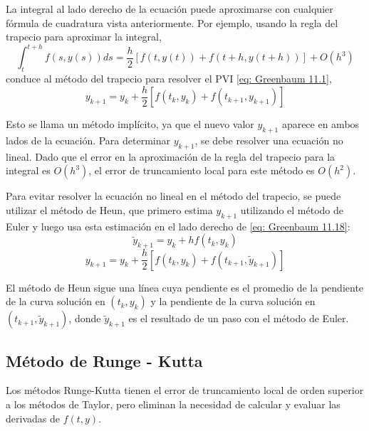La integral al lado derecho de la ecuación puede aproximarse con cualquier fórmula de cuadratura vista anteriormente. Por ejemplo, usando la regla del trapecio para aproximar la integral,
\[ \int_{t}^{t + h} f(s, y(s)) ds = \frac{h}{2}[f(t, y(t)) + f(t + h, y(t + h))] + O(h^3) \]
conduce al método del trapecio para resolver el PVI \ref{eq: Greenbaum 11.1},
\begin{equation}
    \label{eq: Greenbaum 11.18}
    y_{k + 1} = y_k + \frac{h}{2}[f(t_k, y_k) + f(t_{k + 1}, y_{k + 1})]
\end{equation}

Esto se llama un método implícito, ya que el nuevo valor $y_{k + 1}$ aparece en ambos lados de la ecuación. Para determinar $y_{k + 1}$, se debe resolver una ecuación no lineal. Dado que el error en la aproximación de la regla del trapecio para la integral es $O(h^3)$, el error de truncamiento local para este método es $O(h^2)$.

Para evitar resolver la ecuación no lineal en el método del trapecio, se puede utilizar el método de Heun, que primero estima $y_{k + 1}$ utilizando el método de Euler y luego usa esta estimación en el lado derecho de \ref{eq: Greenbaum 11.18}:
\[ \tilde{y}_{k + 1} = y_k + h f(t_k, y_k) \]
\[ y_{k + 1} = y_k + \frac{h}{2} [f(t_k, y_k) + f(t_{k + 1}, \tilde{y}_{k + 1})] \]

El método de Heun sigue una línea cuya pendiente es el promedio de la pendiente de la curva solución en $(t_k, y_k)$ y la pendiente de la curva solución en $(t_{k + 1}, \tilde{y}_{k + 1})$, donde $\tilde{y}_{k + 1}$ es el resultado de un paso con el método de Euler.

\subsection{Método de Runge - Kutta}
Los métodos Runge-Kutta tienen el error de truncamiento local de orden superior a los métodos de Taylor, pero eliminan la necesidad de calcular y evaluar las derivadas de $f(t,y)$.


